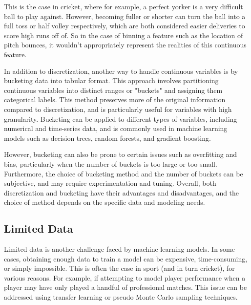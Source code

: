 \documentclass[12pt,a4paper]{report}
\theoremstyle{definition}
\begin{document}
This is the case in cricket, where for example, a perfect yorker \footnotemark{} is a very difficult ball to play against. 
However, becoming fuller or shorter can turn the ball into a full toss \footnotemark{} or half volley \footnotemark{} respectively, which are both considered easier deliveries to score high runs off of.
So in the case of binning a feature such as the location of pitch bounces, it wouldn't appropriately represent the realities of this continuous feature.


In addition to discretization, another way to handle continuous variables is by bucketing data into tabular format. 
This approach involves partitioning continuous variables into distinct ranges or "buckets" and assigning them categorical labels. 
This method preserves more of the original information compared to discretization, and is particularly useful for variables with high granularity. 
Bucketing can be applied to different types of variables, including numerical and time-series data, and is commonly used in machine learning models such as decision trees, random forests, and gradient boosting.

However, bucketing can also be prone to certain issues such as overfitting and bias, particularly when the number of buckets is too large or too small. 
Furthermore, the choice of bucketing method and the number of buckets can be subjective, and may require experimentation and tuning. 
Overall, both discretization and bucketing have their advantages and disadvantages, and the choice of method depends on the specific data and modeling needs.

\subsection{Limited Data}

Limited data is another challenge faced by machine learning models. 
In some cases, obtaining enough data to train a model can be expensive, time-consuming, or simply impossible. 
This is often the case in sport (and in turn cricket), for various reasons. 
For example, if attempting to model player performance when a player may have only played a handful of professional matches.
This issue can be addressed using transfer learning or pseudo Monte Carlo sampling techniques.
\end{document}
